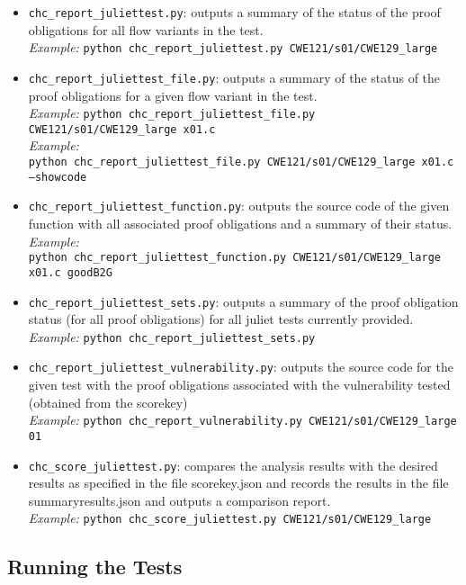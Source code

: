 \documentclass[11pt]{article}
\begin{document}
\begin{itemize}[leftmargin=*]
\item {\tt chc\_report\_juliettest.py}: outputs a summary of the status of the proof
   obligations for all flow variants in the test.\\
\emph{Example:} {\tt python chc\_report\_juliettest.py CWE121/s01/CWE129\_large}
\item {\tt chc\_report\_juliettest\_file.py}: outputs a summary of the status of the
   proof obligations for a given flow variant in the test. \\
\emph{Example:} {\tt python chc\_report\_juliettest\_file.py CWE121/s01/CWE129\_large x01.c}\\
\emph{Example:} \\
{\tt python chc\_report\_juliettest\_file.py CWE121/s01/CWE129\_large x01.c 
 --showcode}
\item {\tt chc\_report\_juliettest\_function.py}: outputs the source code of the given
   function with all associated proof obligations and a summary of their status.\\
\emph{Example:}\\
 {\tt python chc\_report\_juliettest\_function.py CWE121/s01/CWE129\_large x01.c goodB2G}
\item {\tt chc\_report\_juliettest\_sets.py}: outputs a summary of the proof obligation
  status (for all proof obligations) for all juliet tests currently provided.\\
\emph{Example:} {\tt python chc\_report\_juliettest\_sets.py}
\item {\tt chc\_report\_juliettest\_vulnerability.py}: outputs the source code for the
  given test with the proof obligations associated with the vulnerability tested
  (obtained from the scorekey) \\
\emph{Example:} {\tt python chc\_report\_vulnerability.py CWE121/s01/CWE129\_large 01}
\item {\tt chc\_score\_juliettest.py}: compares the analysis results with the desired results
   as specified in the file scorekey.json and records the results in the file summaryresults.json 
   and outputs a comparison report. \\
\emph{Example:} {\tt python chc\_score\_juliettest.py CWE121/s01/CWE129\_large}
\end{itemize}

\subsection{Running the Tests}
\end{document}
